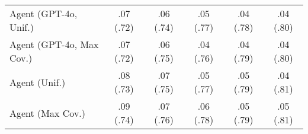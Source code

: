 \begin{table}[h!]
\begin{tabular}{lccccc}
    Agent (GPT-4o, Unif.) & .07 {\small (.72)} & .06 {\small (.74)} & .05 {\small (.77)} & .04 {\small (.78)} & .04 {\small (.80)} \\
    Agent (GPT-4o, Max Cov.) & .07 {\small (.72)} & .06 {\small (.75)} & .04 {\small (.76)} & .04 {\small (.79)} & .04 {\small (.80)} \\
    Agent (Unif.) & .08 {\small (.73)} & .07 {\small (.75)} & .05 {\small (.77)} & .05 {\small (.79)} & .04 {\small (.81)} \\
    Agent (Max Cov.) & .09 {\small (.74)} & .07 {\small (.76)} & .06 {\small (.78)} & .05 {\small (.79)} & .05 {\small (.81)} \\
    \bottomrule
    \end{tabular}
\end{table}